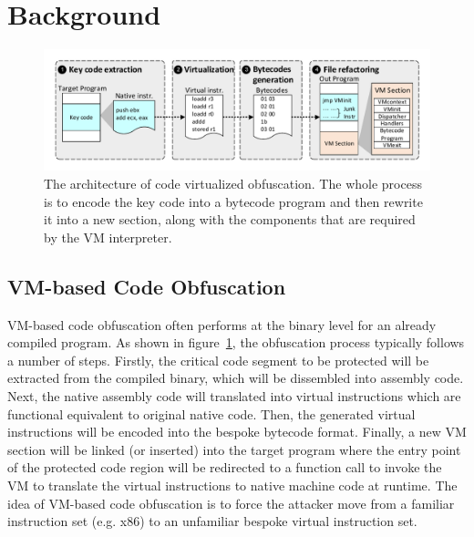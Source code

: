 \section{Background}\label{sec:bak}

\begin{figure}[t]%
    \centering
    \includegraphics[width=1\columnwidth]{figure/figvmp.pdf}
    \caption{The architecture of code virtualized obfuscation. The whole process is to encode the key code into a bytecode program and then rewrite it into a new section, along with the components that are required by the VM interpreter.}\label{fig:Fig.vmp}
\end{figure}

\subsection{VM-based Code Obfuscation}
VM-based code obfuscation often performs at the binary level for an already
compiled program. As shown in figure~\ref{fig:Fig.vmp}, the obfuscation process typically follows a number of steps. 
Firstly, the critical code segment to be protected will be extracted from the compiled
binary, which will be dissembled into assembly code. Next, the native
assembly code will translated into virtual instructions which are functional
equivalent to original native code. Then, the
generated virtual instructions will be encoded into the bespoke bytecode
format.  Finally, a new VM section will be linked (or inserted) into the
target program where the entry point of the protected code region will be
redirected to a function call to invoke the VM to translate the virtual
instructions to native machine code at runtime. The idea of VM-based code
obfuscation is to force the attacker move from a familiar
instruction set (e.g. x86) to an unfamiliar bespoke virtual instruction set.


